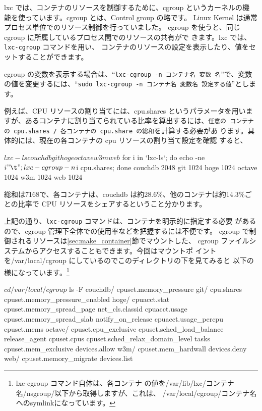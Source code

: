\documentclass[mingoth,a4paper]{jsarticle}
\begin{document}
lxc では、コンテナのリソースを制御するために、cgroup というカーネルの機
能を使っています。cgroup とは、Control group の略です。
Linux Kernel は通常プロセス単位でのリソース制御を行っていました。
cgroup を使うと、同じ cgroup に所属しているプロセス間でのリソースの共有がで
きます。lxc では、\texttt{lxc-cgroup} コマンドを用い、
コンテナのリソースの設定を表示したり、値をセットすることができます。

cgroup の変数を表示する場合は、``\texttt{lxc-cgroup -n コンテナ名 変数
名}''で、変数の値を変更するには、``\texttt{sudo lxc-cgroup -n コンテナ名
変数名 設定する値}''とします。

例えば、CPU リソースの割り当てには、cpu.shares というパラメータを用いま
すが、あるコンテナに割り当てられている比率を算出するには、\texttt{任意の
コンテナの cpu.shares / 各コンテナの cpu.share の総和}を計算する必要があ
ります。具体的には、現在の各コンテナの cpu リソースの割り当て設定を確認
すると、

\begin{commandline}
$ lxc-ls
couchdb  git  hoge  octave  w3m  web
$ for i in `lxc-ls`; do echo -ne $i"\t"; lxc-cgroup -n $i cpu.shares; done
couchdb	2048
git	1024
hoge	1024
octave	1024
w3m	1024
web	1024
\end{commandline}

総和は7168で、各コンテナは、couchdb は約28.6\%、他のコンテナは約14.3\%ご
との比率で CPU リソースをシェアするということ分かります。

上記の通り、\texttt{lxc-cgroup} コマンドは、コンテナを明示的に指定する必要
があるので、cgroup 管理下全体での使用率などを把握するには不便です。
cgroup で制御されるリソースは\ref{sec:make_container}節でマウントした、
cgroup ファイルシステムからアクセスすることもできます。今回はマウントポ
イントを/var/local/cgroup にしているのでこのディレクトリの下を見てみると
以下の様になっています。\footnote{lxc-cgroup コマンド自体は、各コンテナ
の値を/var/lib/lxc/コンテナ名/nsgroup/以下から取得しますが、これは、
/var/local/cgroup/コンテナ名 へのsymlinkになっています。}

\begin{commandline}
$ cd /var/local/cgroup
$ ls -F
couchdb/               cpuset.memory_pressure           git/
cpu.shares             cpuset.memory_pressure_enabled   hoge/
cpuacct.stat           cpuset.memory_spread_page        net_cls.classid
cpuacct.usage          cpuset.memory_spread_slab        notify_on_release
cpuacct.usage_percpu   cpuset.mems                      octave/
cpuset.cpu_exclusive   cpuset.sched_load_balance        release_agent
cpuset.cpus            cpuset.sched_relax_domain_level  tasks
cpuset.mem_exclusive   devices.allow                    w3m/
cpuset.mem_hardwall    devices.deny                     web/
cpuset.memory_migrate  devices.list
\end{commandline}
\end{document}
